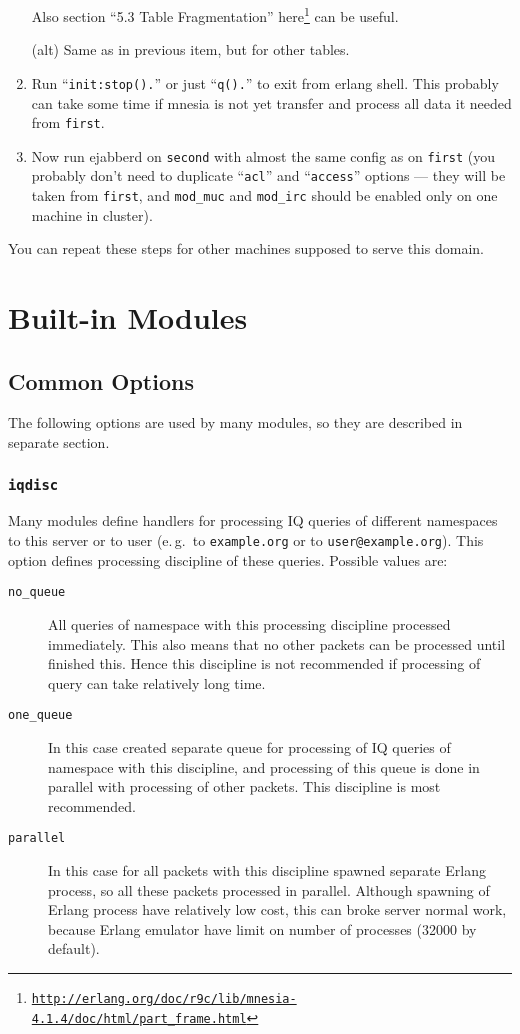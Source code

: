 \documentclass[a4paper,10pt]{article}
\newcommand{\bracehack}{\def\{{\char"7B}\def\}{\char"7D}}
\newcommand{\jid}[1]{\texttt{#1}}
\newcommand{\option}[1]{\texttt{#1}}
\newcommand{\term}[1]{\texttt{#1}}
\newcommand{\titem}[1]{\item[\bracehack\texttt{#1}]}
\gdef\footahref#1#2{#2\footnote{\href{#1}{\texttt{#1}}}}
\begin{document}
\begin{enumerate}
  Also section ``5.3 Table Fragmentation''
  \footahref{http://erlang.org/doc/r9c/lib/mnesia-4.1.4/doc/html/part_frame.html}{here}
  can be useful.
  
  (alt) Same as in previous item, but for other tables.

  
\item Run ``\verb|init:stop().|'' or just ``\verb|q().|'' to exit from
  erlang shell.  This probably can take some time if mnesia is not yet
  transfer and process all data it needed from \term{first}.

  
\item Now run ejabberd on \term{second} with almost the same config as
  on \term{first} (you probably don't need to duplicate ``\verb|acl|''
  and ``\verb|access|'' options --- they will be taken from
  \term{first}, and \verb|mod_muc| and \verb|mod_irc| should be
  enabled only on one machine in cluster).
\end{enumerate}

You can repeat these steps for other machines supposed to serve this
domain.


\appendix{}

\section{Built-in Modules}
\label{sec:modules}

\subsection{Common Options}
\label{sec:modcommonopts}

The following options are used by many modules, so they are described in
separate section.

\subsubsection{\option{iqdisc}}
\label{sec:modiqdiscoption}

Many modules define handlers for processing IQ queries of different namespaces
to this server or to user (e.\,g.\ to \jid{example.org} or to
\jid{user@example.org}).  This option defines processing discipline of
these queries.  Possible values are:
\begin{description}
\titem{no\_queue} All queries of namespace with this processing
  discipline processed immediately.  This also means that no other packets can
  be processed until finished this.  Hence this discipline is not recommended
  if processing of query can take relatively long time.
\titem{one\_queue} In this case created separate queue for processing
  of IQ queries of namespace with this discipline, and processing of this queue
  is done in parallel with processing of other packets. This discipline is most
  recommended.
\titem{parallel} In this case for all packets with this discipline
  spawned separate Erlang process, so all these packets processed in parallel.
  Although spawning of Erlang process have relatively low cost, this can broke
  server normal work, because Erlang emulator have limit on number of processes
  (32000 by default).
\end{description}
\end{document}
